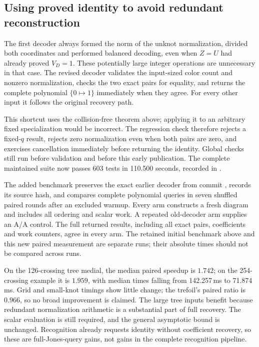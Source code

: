 \subsection{Using proved identity to avoid redundant reconstruction}

The first decoder always formed the norm of the unknot normalization, divided
both coordinates and performed balanced decoding, even when $Z=U$ had already
proved $V_D=1$.  These potentially large integer operations are unnecessary
in that case.  The revised decoder validates the input-sized color count and
nonzero normalization, checks the two exact pairs for equality, and returns
the complete polynomial $\{0\mapsto1\}$ immediately when they agree.
For every other input it follows the original recovery path.

This shortcut uses the collision-free theorem above; applying it to an
arbitrary fixed specialization would be incorrect.  The regression check
therefore rejects a fixed-$q$ result, rejects zero normalization even when
both pairs are zero, and exercises cancellation immediately before returning
the identity.  Global checks still run before validation and before this
early publication.  The complete maintained suite now passes 603 tests in
110.500 seconds, recorded in
.

The added benchmark preserves the exact earlier decoder from commit
, records its source hash, and compares complete polynomial
queries in seven shuffled paired rounds after an excluded warmup.  Every arm
constructs a fresh diagram and includes all ordering and scalar work.  A
repeated old-decoder arm supplies an A/A control.  The full returned results,
including all exact pairs, coefficients and work counters, agree in every
arm.  The retained initial benchmark above and this new paired measurement
are separate runs; their absolute times should not be compared across runs.



On the 126-crossing tree medial, the median paired speedup is $1.742$;
on the 254-crossing example it is $1.959$, with median times falling from
142.257\,ms to 71.874\,ms.  Grid and small-knot timings show little change;
the trefoil's paired ratio is $0.966$, so no broad improvement is claimed.
The large tree inputs benefit because redundant normalization arithmetic is
a substantial part of full recovery.  The scalar evaluation is still required,
and the general asymptotic bound is unchanged.  Recognition already requests
identity without coefficient recovery, so these are full-Jones-query gains,
not gains in the complete recognition pipeline.
